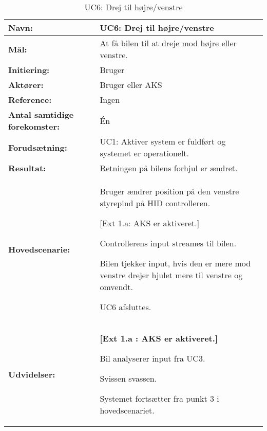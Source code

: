 \begin{table}[h]
\begin{tabularx}{\textwidth}{| L{3.3 cm} | Z |} \hline

\textbf{Navn:} 						& UC6: Drej til højre/venstre\\ \hline
\textbf{Mål:}						& At få bilen til at dreje mod højre eller venstre. \\ \hline
\textbf{Initiering:}				& Bruger \\ \hline
\textbf{Aktører:} 					& Bruger eller AKS \\ \hline
\textbf{Reference:} 				& Ingen\\ \hline
\textbf{Antal samtidige forekomster:} & Én \\ \hline
\textbf{Forudsætning:} 				& UC1: Aktiver system er fuldført og systemet er operationelt. \\ \hline
\textbf{Resultat:}					& Retningen på bilens forhjul er ændret. \\ \hline
\textbf{Hovedscenarie:}				& 

\begin{packed_enum}
\item Bruger ændrer position på den venstre styrepind på HID controlleren.
	\begin{packed_item}\itemsep1pt \parskip0pt 
	\item {[}Ext 1.a: AKS er aktiveret.{]}
	\end{packed_item}
\item Controllerens input streames til bilen.
\item Bilen tjekker input, hvis den er mere mod venstre drejer hjulet mere til venstre og omvendt. %
\item UC6 afsluttes.
\end{packed_enum} \\ \hline
\textbf{Udvidelser:}				&  
\textbf{{[}Ext 1.a : AKS er aktiveret.{]}}
	\begin{packed_enum}\itemsep1pt \parskip0pt 
		\item Bil analyserer input fra UC3. %
		\item Svissen svassen.
		\item Systemet fortsætter fra punkt 3 i hovedscenariet.
	\end{packed_enum}
\\ \hline
\end{tabularx}
\caption{UC6: Drej til højre/venstre}
\label{tbl:UC6}
\end{table}